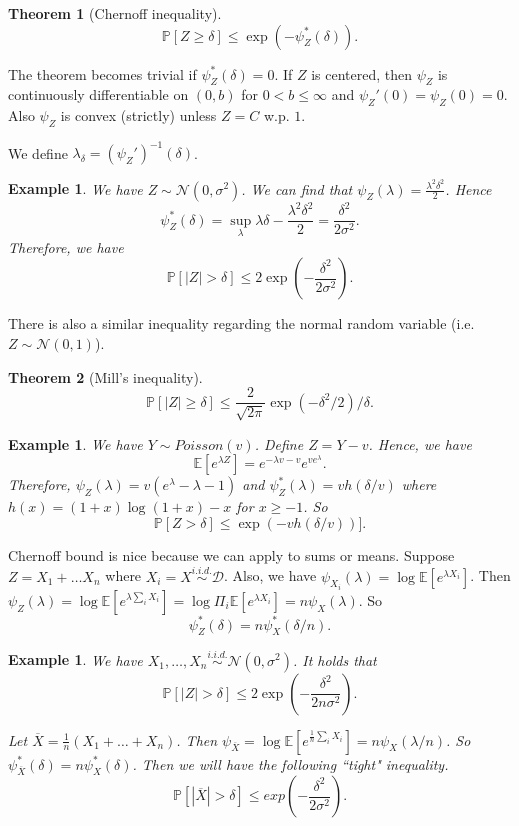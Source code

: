 \documentclass[10pt]{article}
\newcounter{lecnum}
\newtheorem{theorem}{Theorem}[lecnum]
\newtheorem{example}[ex]{Example}
\newcommand{\E}[1]{\mathbb{E}\!\left[#1\right]}
\renewcommand{\P}{\mathbb{P}}
\renewcommand{\bar}{\overline}
\begin{document}
\begin{theorem}[Chernoff inequality]
$$
\P[ Z \geq \delta ] \leq \exp( - \psi_Z^*(\delta) ).
$$
\end{theorem}

The theorem becomes trivial if $ \psi_Z^*(\delta) = 0$. If $Z$ is centered, then $\psi_Z$ is continuously differentiable on $(0, b)$ for $0 < b \leq \infty$ and $\psi_Z'(0) = \psi_Z(0) = 0$. Also $\psi_Z$ is convex (strictly) unless $Z = C$ w.p. $1$. 

We define $\lambda_{\delta} = ( \psi_Z' )^{-1}(\delta)$.

\begin{example}
We have $Z \sim \mathcal{N}(0, \sigma^2)$. We can find that $\psi_Z(\lambda) = \frac{\lambda^2 \delta^2}{2}$. Hence 
$$
\psi_Z^*(\delta) = \sup_{\lambda} \lambda \delta - \frac{\lambda^2 \delta^2}{2} = \frac{\delta^2}{ 2 \sigma^2}.
$$
Therefore, we have 
$$
\P[ |Z| > \delta ] \leq 2\exp\left( - \frac{\delta^2}{2 \sigma^2} \right).
$$
\end{example}

There is also a similar inequality regarding the normal random variable (i.e. $Z \sim \mathcal{N}(0, 1)$).

\begin{theorem}[Mill's inequality]
$$
\P[ |Z| \geq \delta ] \leq \frac{2}{\sqrt{2 \pi}} \exp( - \delta^2 / 2 ) / \delta.
$$
\end{theorem}

\begin{example}
We have $Y \sim Poisson(v)$. Define $Z = Y - v$. Hence, we have 
$$
\E{ e^{\lambda Z} } = e^{ - \lambda v - v} e^{ve^{\lambda}}.
$$
Therefore, $\psi_Z(\lambda) = v(e^{\lambda} - \lambda - 1)$ and $\psi_Z^*(\lambda) = v h(\delta / v)$ where $h(x) = (1 + x) \log (1 +x) - x $ for $x \geq -1$. So
$$
\P[ Z > \delta]  \leq \exp( - v h(\delta / v))].
$$
\end{example}


Chernoff bound is nice because we can apply to sums or means. Suppose $Z = X_1 + \dots X_n$ where $X_i  = X \stackrel{i.i.d.}{\sim} \mathcal{D}$. Also, we have $\psi_{X_i}(\lambda) = \log \E{ e^{\lambda X_i}}$. Then $\psi_Z(\lambda) = \log \E{ e^{\lambda \sum_i X_i}} = \log \Pi_i \E{ e^{\lambda X_i}} = n \psi_X(\lambda)$. So
$$
\psi_Z^*(\delta) = n \psi_X^*( \delta / n).
$$

\begin{example}
We have $X_1, \dots, X_n \stackrel{i.i.d.}{\sim} \mathcal{N}(0, \sigma^2)$. It holds that 
$$
\P[ |Z| > \delta ] \leq 2 \exp\left( - \frac{\delta^2}{2n\sigma^2} \right).
$$

Let $\bar{X} = \frac{1}{n} (X_1 + \dots + X_n)$. Then $\psi_{\bar{X}} = \log \E{ e^{\frac{1}{n} \sum_i X_i} } = n \psi_X( \lambda / n)$. So $\psi_{\bar{X}}^*(\delta) = n \psi_{X}^*(\delta)$. Then we will have the following ``tight" inequality.
$$
\P [ | \bar{X} | > \delta ] \leq exp\left( -\frac{\delta^2}{2 \sigma^2} \right). 
$$

\end{example}



\end{document}
